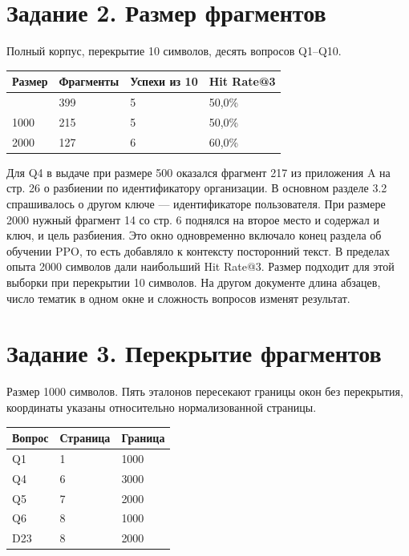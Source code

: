 \documentclass[12pt,a4paper]{article}
\begin{document}
\hypertarget{ux437ux430ux434ux430ux43dux438ux435-2.-ux440ux430ux437ux43cux435ux440-ux444ux440ux430ux433ux43cux435ux43dux442ux43eux432}{%
\section{Задание 2. Размер
фрагментов}\label{ux437ux430ux434ux430ux43dux438ux435-2.-ux440ux430ux437ux43cux435ux440-ux444ux440ux430ux433ux43cux435ux43dux442ux43eux432}}

Полный корпус, перекрытие 10 символов, десять вопросов Q1--Q10.

\begin{longtable}[]{@{}llll@{}}
\toprule\noalign{}
Размер & Фрагменты & Успехи из 10 & Hit Rate@3 \\
\midrule\noalign{}
\endhead
\bottomrule\noalign{}
\endlastfoot
500 & 399 & 5 & 50,0\% \\
1000 & 215 & 5 & 50,0\% \\
2000 & 127 & 6 & 60,0\% \\
\end{longtable}

Для Q4 в выдаче при размере 500 оказался фрагмент 217 из приложения A на
стр. 26 о разбиении по идентификатору организации. В основном разделе
3.2 спрашивалось о другом ключе --- идентификаторе пользователя. При
размере 2000 нужный фрагмент 14 со стр. 6 поднялся на второе место и
содержал и ключ, и цель разбиения. Это окно одновременно включало конец
раздела об обучении PPO, то есть добавляло к контексту посторонний
текст. В пределах опыта 2000 символов дали наибольший Hit Rate@3. Размер
подходит для этой выборки при перекрытии 10 символов. На другом
документе длина абзацев, число тематик в одном окне и сложность вопросов
изменят результат.

\hypertarget{ux437ux430ux434ux430ux43dux438ux435-3.-ux43fux435ux440ux435ux43aux440ux44bux442ux438ux435-ux444ux440ux430ux433ux43cux435ux43dux442ux43eux432}{%
\section{Задание 3. Перекрытие
фрагментов}\label{ux437ux430ux434ux430ux43dux438ux435-3.-ux43fux435ux440ux435ux43aux440ux44bux442ux438ux435-ux444ux440ux430ux433ux43cux435ux43dux442ux43eux432}}

Размер 1000 символов. Пять эталонов пересекают границы окон без
перекрытия, координаты указаны относительно нормализованной страницы.

\begin{longtable}[]{@{}lll@{}}
\toprule\noalign{}
Вопрос & Страница & Граница \\
\midrule\noalign{}
\endhead
\bottomrule\noalign{}
\endlastfoot
Q1 & 1 & 1000 \\
Q4 & 6 & 3000 \\
Q5 & 7 & 2000 \\
Q6 & 8 & 1000 \\
D23 & 8 & 2000 \\
\end{longtable}
\end{document}
